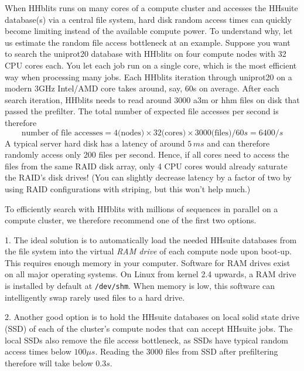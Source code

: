 \documentclass[11pt,a4paper]{article}
\begin{document}
When HHblits runs on many cores of a compute cluster and accesses the HHsuite database(s) 
via a central file system, hard disk random access times can quickly become limiting instead 
of the available compute power. To understand why, let us estimate the random file access 
bottleneck at an example. Suppose you want to search the uniprot20 database with HHblits 
on four compute nodes with 32 CPU cores each. You let each job run on a single core, 
which is the most efficient way when processing many jobs. Each HHblits iteration through 
uniprot20 on a modern 3GHz Intel/AMD core takes around, say, 60s on average. After each search iteration, 
HHblits needs to read around $3000$ a3m or hhm files on disk that passed the prefilter. 
The total number of expected file accesses per second is therefore 
\begin{equation}
\textrm{number of file accesses} = 4 \textrm{(nodes)} \times 32 \textrm{(cores)} \times 3000 \textrm{(files)} / 60s = 6400/s
\end{equation}
A typical server hard disk has a latency of around $5\,ms$ and can therefore randomly access 
only 200 files per second. Hence, if all cores need to access the files from the same RAID 
disk array, only 4 CPU cores would already saturate the RAID's disk drives! (You can slightly 
decrease latency by a factor of two by using RAID configurations with striping, but this 
won't help much.)

To efficiently search with HHblits with millions of sequences in parallel on a compute cluster, 
we therefore recommend one of the first two options.

1. The ideal solution is to automatically load the needed HHsuite databases from the 
file system into the virtual {\it RAM drive} of each compute node upon boot-up. This requires 
enough memory in your computer. Software for RAM drives exist on all major operating systems. 
On Linux from kernel 2.4 upwards, a RAM drive is installed by default at \verb`/dev/shm`. When 
memory is low, this software can intelligently swap rarely used files to a hard drive. 

2. Another good option is to hold the HHsuite databases on local solid state drive (SSD) 
of each of the cluster's compute nodes that can accept HHsuite jobs. The local SSDs also 
remove the file access bottleneck, as SSDs have typical random access times below 
$100 \mu s$. Reading the 3000 files from SSD after prefiltering therefore will take below $0.3 s$.
\end{document}
